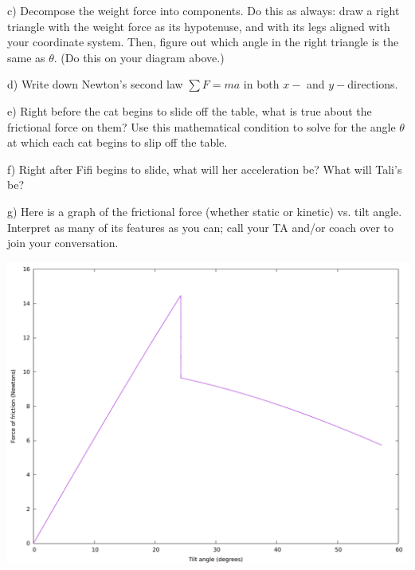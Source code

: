 \documentclass[12pt]{article}
\begin{document}
		\vspace{3in}
		
		
		c) Decompose the weight force into components. Do this as always: draw a right triangle with the weight force as its 
		hypotenuse, and with its legs aligned with your coordinate system. Then, figure out which angle in the right triangle
		is the same as $\theta$. (Do this on your diagram above.)
		
		d) Write down Newton's second law $\sum F = ma$ in both $x-$ and $y-$directions. 
		
		\vspace{2in}
		
		e) Right before the cat begins to slide off the table, what is true about the frictional force on them? Use this 
		mathematical condition to solve for the angle $\theta$ at which each cat begins to slip off the table.
		
		\vspace{2in}
		
		f) Right after Fifi begins to slide, what will her acceleration be? What will Tali's be?
		
		\vspace{3in}
		
		g) Here is a graph of the frictional force (whether static or kinetic) vs. tilt angle. Interpret as many of its features as you
		can; call your TA and/or coach over to join your conversation.
		
		\begin{center}
			\includegraphics[width=.9\textwidth]{tilt.pdf}
		\end{center}
		
		
		
	
\end{document}
